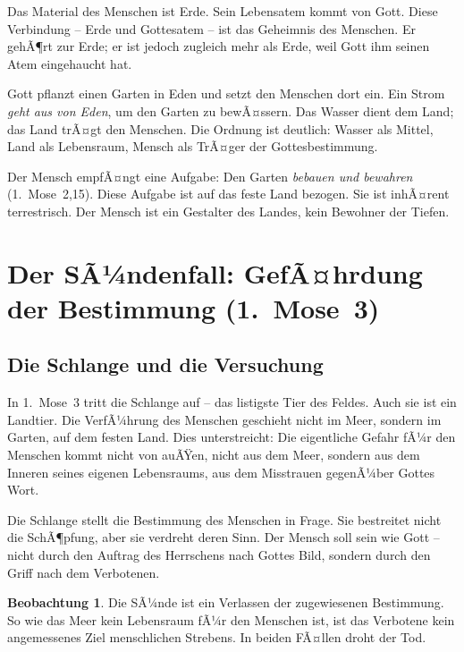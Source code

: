 ﻿\documentclass[a4paper,12pt]{article}
\theoremstyle{definition}
\newtheorem{observation}{Beobachtung}[section]
\begin{document}
Das Material des Menschen ist Erde. Sein Lebensatem kommt von Gott. Diese Verbindung
-- Erde und Gottesatem -- ist das Geheimnis des Menschen. Er gehÃ¶rt zur Erde; er
ist jedoch zugleich mehr als Erde, weil Gott ihm seinen Atem eingehaucht hat.

Gott pflanzt einen Garten in Eden und setzt den Menschen dort ein. Ein Strom
\textit{geht aus von Eden}, um den Garten zu bewÃ¤ssern. Das Wasser dient dem Land;
das Land trÃ¤gt den Menschen. Die Ordnung ist deutlich: Wasser als Mittel, Land als
Lebensraum, Mensch als TrÃ¤ger der Gottesbestimmung.

Der Mensch empfÃ¤ngt eine Aufgabe: Den Garten \textit{bebauen und bewahren}
(1.~Mose~2,15). Diese Aufgabe ist auf das feste Land bezogen. Sie ist inhÃ¤rent
terrestrisch. Der Mensch ist ein Gestalter des Landes, kein Bewohner der Tiefen.

\section{Der SÃ¼ndenfall: GefÃ¤hrdung der Bestimmung (1.~Mose~3)}

\subsection{Die Schlange und die Versuchung}

In 1.~Mose~3 tritt die Schlange auf -- das listigste Tier des Feldes. Auch sie
ist ein Landtier. Die VerfÃ¼hrung des Menschen geschieht nicht im Meer, sondern
im Garten, auf dem festen Land. Dies unterstreicht: Die eigentliche Gefahr fÃ¼r
den Menschen kommt nicht von auÃŸen, nicht aus dem Meer, sondern aus dem Inneren
seines eigenen Lebensraums, aus dem Misstrauen gegenÃ¼ber Gottes Wort.

Die Schlange stellt die Bestimmung des Menschen in Frage. Sie bestreitet nicht
die SchÃ¶pfung, aber sie verdreht deren Sinn. Der Mensch soll sein wie Gott --
nicht durch den Auftrag des Herrschens nach Gottes Bild, sondern durch den
Griff nach dem Verbotenen.

\begin{observation}
    Die SÃ¼nde ist ein Verlassen der zugewiesenen Bestimmung. So wie das Meer kein
    Lebensraum fÃ¼r den Menschen ist, ist das Verbotene kein angemessenes Ziel
    menschlichen Strebens. In beiden FÃ¤llen droht der Tod.
\end{observation}
\end{document}
